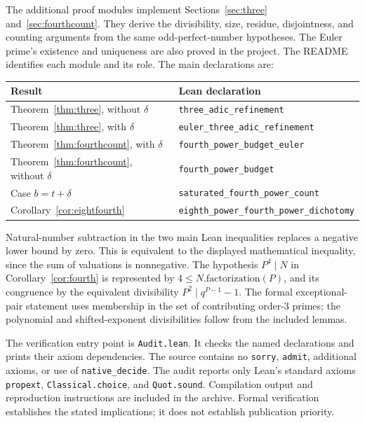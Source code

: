 \documentclass[11pt]{article}
\theoremstyle{remark}
\begin{document}
The additional proof modules implement Sections~\ref{sec:three}
and~\ref{sec:fourthcount}. They derive the divisibility, size, residue,
disjointness, and counting arguments from the same odd-perfect-number
hypotheses. The Euler prime's existence and uniqueness are also proved
in the project. The README identifies each module and its role.
The main declarations are:
\begin{center}
\small
\begin{tabular}{@{}p{}p{}@{}}
\toprule
Result & Lean declaration \\
\midrule
Theorem~\ref{thm:three}, without $\delta$ & \texttt{three\_adic\_refinement} \\[3pt]
Theorem~\ref{thm:three}, with $\delta$ & \texttt{euler\_three\_adic\_refinement} \\[3pt]
Theorem~\ref{thm:fourthcount}, with $\delta$ & \texttt{fourth\_power\_budget\_euler} \\[3pt]
Theorem~\ref{thm:fourthcount}, without $\delta$ & \texttt{fourth\_power\_budget} \\[3pt]
Case $b=t+\delta$ & \texttt{saturated\_fourth\_power\_count} \\[3pt]
Corollary~\ref{cor:eightfourth} & \texttt{eighth\_power\_fourth\_power\_dichotomy} \\
\bottomrule
\end{tabular}
\end{center}

Natural-number subtraction in the two main Lean inequalities replaces a negative lower bound by zero. This is equivalent to the displayed mathematical inequality, since the sum of valuations is nonnegative. The hypothesis $P^4\mid N$ in Corollary~\ref{cor:fourth} is represented by $4\le N.\mathrm{factorization}(P)$, and its congruence by the equivalent divisibility $P^2\mid q^{P-1}-1$. The formal exceptional-pair statement uses membership in the set of contributing order-$3$ primes; the polynomial and shifted-exponent divisibilities follow from the included lemmas.

The verification entry point is \texttt{Audit.lean}. It checks the named declarations and prints their axiom dependencies. The source contains no \texttt{sorry}, \texttt{admit}, additional axioms, or use of \texttt{native\_decide}. The audit reports only Lean's standard axioms \texttt{propext}, \texttt{Classical.choice}, and \texttt{Quot.sound}. Compilation output and reproduction instructions are included in the archive. Formal verification establishes the stated implications; it does not establish publication priority.
\end{document}
